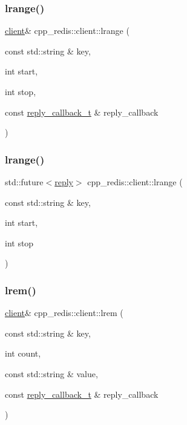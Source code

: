 \subsubsection{\texorpdfstring{lrange()}{lrange()}\hspace{0.1cm}{\footnotesize\ttfamily [1/2]}}
{\footnotesize\ttfamily \hyperlink{classcpp__redis_1_1client}{client}\& cpp\+\_\+redis\+::client\+::lrange (\begin{DoxyParamCaption}\item[{const std\+::string \&}]{key,  }\item[{int}]{start,  }\item[{int}]{stop,  }\item[{const \hyperlink{classcpp__redis_1_1client_a061a1140d36d2eaeda82b09a0bb3f9f2}{reply\+\_\+callback\+\_\+t} \&}]{reply\+\_\+callback }\end{DoxyParamCaption})}

\mbox{\label{classcpp__redis_1_1client_a1e7c8d099459af438cc4ed215afef066}} 
\subsubsection{\texorpdfstring{lrange()}{lrange()}\hspace{0.1cm}{\footnotesize\ttfamily [2/2]}}
{\footnotesize\ttfamily std\+::future$<$\hyperlink{classcpp__redis_1_1reply}{reply}$>$ cpp\+\_\+redis\+::client\+::lrange (\begin{DoxyParamCaption}\item[{const std\+::string \&}]{key,  }\item[{int}]{start,  }\item[{int}]{stop }\end{DoxyParamCaption})}

\mbox{\label{classcpp__redis_1_1client_a26d934d6fd06503d8727969be5ebb043}} 
\subsubsection{\texorpdfstring{lrem()}{lrem()}\hspace{0.1cm}{\footnotesize\ttfamily [1/2]}}
{\footnotesize\ttfamily \hyperlink{classcpp__redis_1_1client}{client}\& cpp\+\_\+redis\+::client\+::lrem (\begin{DoxyParamCaption}\item[{const std\+::string \&}]{key,  }\item[{int}]{count,  }\item[{const std\+::string \&}]{value,  }\item[{const \hyperlink{classcpp__redis_1_1client_a061a1140d36d2eaeda82b09a0bb3f9f2}{reply\+\_\+callback\+\_\+t} \&}]{reply\+\_\+callback }\end{DoxyParamCaption})}

